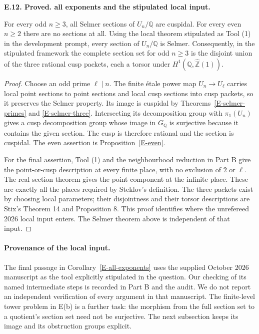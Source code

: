 \documentclass[11pt,oneside]{article}
\makeatletter
\newcounter{statementanchor}
\newenvironment{statement}[3]{%
 \refstepcounter{statementanchor}\def\@currentlabel{#1}%
 \par\addvspace{9pt}\noindent
 \textbf{#1. #2. #3.}\par\nobreak\noindent\ignorespaces
}{\par\addvspace{5pt}}
\makeatother
\begin{document}
\begin{statement}{E.12}{Proved}{all exponents and the stipulated local input}
\label{st:E.12}
\label{E-all-exponents}
For every odd $n\geq3$, all Selmer sections of
$U_n/\mathbb Q$ are cuspidal. For every even
$n\geq2$ there are no sections at all.
Using the local theorem stipulated as Tool (1)
in the development prompt, every section of
$U_n/\mathbb Q$ is Selmer. Consequently,
in the stipulated framework the complete
section set for odd $n\geq3$ is the disjoint
union of the three rational cusp packets,
each a torsor under
$H^1(\mathbb Q,\widehat{\mathbb Z}(1))$.
\end{statement}
\begin{proof}
Choose an odd prime $\ell\mid n$. The finite étale
power map $U_n\to U_\ell$ carries local point
sections to point sections and local cusp
sections into cusp packets, so it preserves
the Selmer property. Its image is cuspidal
by Theorems~\ref{E-selmer-primes} and
\ref{E-selmer-three}. Intersecting its
decomposition group with $\pi_1(U_n)$ gives
a cusp decomposition group whose image in
$G_{\mathbb Q}$ is surjective because it
contains the given section. The cusp is
therefore rational and the section is
cuspidal. The even assertion is
Proposition~\ref{E-even}.

For the final assertion, Tool (1) and the
neighbourhood reduction in Part B give the
point-or-cusp description at every finite
place, with no exclusion of $2$ or $\ell$.
The real section theorem gives the point
component at the infinite place.
These are exactly all the places required
by Steklov's definition. The three packets
exist by choosing local parameters; their
disjointness and their torsor descriptions
are Stix's Theorem 14 and Proposition 8.
This proof identifies where the unrefereed
2026 local input enters. The Selmer theorem
above is independent of that input.
\end{proof}

\paragraph{Provenance of the local input.}
The final passage in Corollary~\ref{E-all-exponents}
uses the supplied October 2026 manuscript as
the tool explicitly stipulated in the question.
Our checking of its named intermediate steps
is recorded in Part B and the audit.
We do not report an independent verification
of every argument in that manuscript.
The finite-level tower problem in E(b) is
a further task: the morphism from the full
section set to a quotient's section set need
not be surjective. The next subsection keeps
its image and its obstruction groups explicit.
\end{document}
